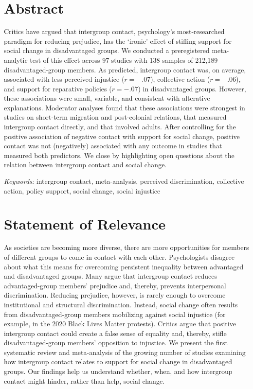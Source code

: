 \documentclass[12pt, letterpaper]{article}
\begin{document}
\section{Abstract}

\noindent Critics have argued that intergroup contact, psychology's
most-researched paradigm for reducing prejudice, has the `ironic' effect
of stifling support for social change in disadvantaged groups. We
conducted a preregistered meta-analytic test of this effect across 97
studies with 138 samples of 212,189 disadvantaged-group members. As
predicted, intergroup contact was, on average, associated with less
perceived injustice (\(r = -.07\)), collective action (\(r = -.06\)),
and support for reparative policies (\(r = -.07\)) in disadvantaged
groups. However, these associations were small, variable, and consistent
with alterative explanations. Moderator analyses found that these
associations were strongest in studies on short-term migration and
post-colonial relations, that measured intergroup contact directly, and
that involved adults. After controlling for the positive association of
negative contact with support for social change, positive contact was
not (negatively) associated with any outcome in studies that measured
both predictors. We close by highlighting open questions about the
relation between intergroup contact and social change.

\textit{Keywords:} intergroup contact, meta-analysis, perceived discrimination, collective
action, policy support, social change, social injustice

\newpage

\section{Statement of Relevance}

\noindent As societies are becoming more diverse, there are more opportunities for
members of different groups to come in contact with each other.
Psychologists disagree about what this means for overcoming persistent
inequality between advantaged and disadvantaged groups. Many argue that
intergroup contact reduces advantaged-group members' prejudice and,
thereby, prevents interpersonal discrimination. Reducing prejudice,
however, is rarely enough to overcome institutional and structural
discrimination. Instead, social change often results from
disadvantaged-group members mobilizing against social injustice (for
example, in the 2020 Black Lives Matter protests). Critics argue that
positive intergroup contact could create a false sense of equality and,
thereby, stifle disadvantaged-group members' opposition to injustice. We
present the first systematic review and meta-analysis of the growing
number of studies examining how intergroup contact relates to support
for social change in disadvantaged groups. Our findings help us
understand whether, when, and how intergroup contact might hinder,
rather than help, social change.
\end{document}
